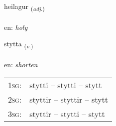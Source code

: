 \documentclass[frontgrid, backgrid]{flacards}\usepackage[]{graphicx}\usepackage[]{color}
\begin{document}
\renewcommand{\flhead}{\vskip5pt \fboxsep=0pt {\small\bfseries\footnotesize Lýsingarorð | Adjective}}
\renewcommand{\fcfoot}{\vskip5pt \fboxsep=0pt \hspace{2pt}{\small\bfseries\footnotesize 2K}}

\renewcommand{\blhead}{\vskip5pt {\small\bfseries\footnotesize Lýsingarorð | Adjective }}
\renewcommand{\bcfoot}{\vskip5pt \hspace{2pt}{\small\bfseries\footnotesize 2K}}


{heilagur \small{\textsubscript{(\textit{adj.})}} \\[1ex] %
\textphonetic{[heiːlaɣʏr]} \\
en: \emph{holy} \\  [2ex]
\renewcommand*{\arraystretch}{0.8}
}

\renewcommand{\flhead}{\vskip5pt \fboxsep=0pt {\small\bfseries\footnotesize Sagnorð | Verb}}
\renewcommand{\fcfoot}{\vskip5pt \fboxsep=0pt \hspace{2pt}{\small\bfseries\footnotesize 2K}}

\renewcommand{\blhead}{\vskip5pt {\small\bfseries\footnotesize Sagnorð | Verb }}
\renewcommand{\bcfoot}{\vskip5pt \hspace{2pt}{\small\bfseries\footnotesize 2K}}


{stytta \small{\textsubscript{(\textit{v.})}} \\[1ex] %
\textphonetic{[stɪhta]} \\
en: \emph{shorten} \\  [2ex]
\renewcommand*{\arraystretch}{0.8}
\begin{tabular}{p{1cm}l}
\textsc{1sg}: & stytti -- stytti -- stytt \\ 
\textsc{2sg}: & styttir -- styttir -- stytt \\ 
\textsc{3sg}: & styttir -- stytti -- stytt \\ 
\end{tabular}
}
\end{document}
